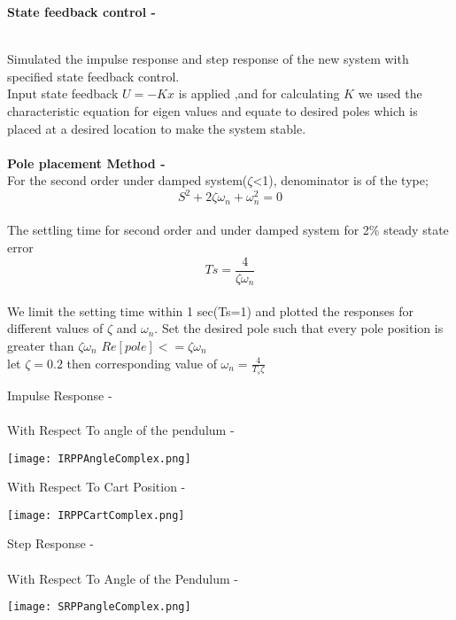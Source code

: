 \documentclass[11pt]{article}
\begin{document}
{\large \textbf{State feedback control - \\\\}}
{Simulated the impulse response and step response of
the new system with specified state feedback control.\\
Input state feedback $U=-Kx$ is applied ,and for calculating $K$ we used the characteristic equation for eigen values and equate to desired poles which is placed at a desired location to make the system stable.\\\\
{\textbf{Pole placement Method - \\}}
{
For the second order under damped system($\zeta$<1), denominator is of the type;}\\
$$S^2+2\zeta\omega_n+\omega^2_n=0$$\\
{The settling time for second order and under damped system for 2\% steady state error}\\
$$ Ts=\frac{4}{\zeta\omega_n} 
$$\\

{We limit the setting time within 1 sec(Ts=1) and plotted the responses for different values of $\zeta$ and $\omega_n$. Set the desired pole such that every pole position is greater than $\zeta\omega_n$ $Re[pole]<=\zeta\omega_n$\\}
{let $\zeta=0.2$ then corresponding value of $\omega_n=\frac{4}{T_s\zeta}$\\}

Impulse Response - \\\\
With Respect To angle of the pendulum - \\
\begin{center}
\texttt{[image: IRPPAngleComplex.png]}
\end{center}

With Respect To Cart Position - \\
\begin{center}
\texttt{[image: IRPPCartComplex.png]}
\end{center}

Step Response - \\\\
With Respect To Angle of the Pendulum - \\
\begin{center}
\texttt{[image: SRPPangleComplex.png]}
\end{center}

}
\end{document}
